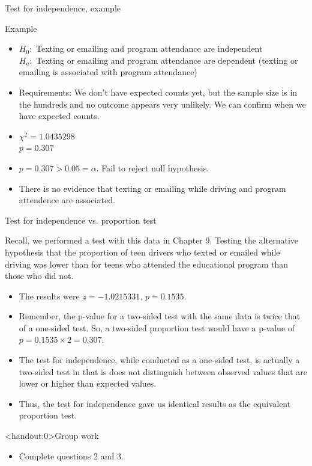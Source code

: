 \documentclass[xcolor=table]{beamer}
\begin{document}
\begin{frame}{Test for independence, example}
\begin{exampleblock}{Example}
\large
\begin{itemize}
\pause\item $H_0:$ Texting or emailing and program attendance are independent\\
$H_a:$ Texting or emailing and program attendance are dependent (texting or emailing is associated with program attendance)
\pause\item Requirements: We don't have expected counts yet, but the sample size is in the hundreds and no outcome appears very unlikely. We can confirm when we have expected counts.
\pause\item $\chi^2 = 1.0435298$\\
$p = 0.307 $
\pause\item $p = 0.307 > 0.05 = \alpha$. Fail to reject null hypothesis.
\pause\item There is no evidence that texting or emailing while driving and program attendence are associated.
\end{itemize}
\end{exampleblock}
\end{frame}

\begin{frame}{Test for independence vs. proportion test}
\begin{block}{}
\large
Recall, we performed a test with this data in Chapter 9. Testing the alternative hypothesis that the proportion of teen drivers who texted or emailed while driving was lower than for teens who attended the educational program than those who did not. \\
\begin{itemize}
\pause\item The results were $z = -1.0215331, \, p = 0.1535$.\\
\pause\item Remember, the p-value for a two-sided test with the same data is twice that of a one-sided test. So, a two-sided proportion test would have a p-value of $p = 0.1535 \times 2 = 0.307$.\\
\pause\item The test for independence, while conducted as a one-sided test, is actually a two-sided test in that is does not distinguish between observed values that are lower or higher than expected values.\\
\pause\item Thus, the test for independence gave us identical results as the equivalent proportion test.
\end{itemize}
\end{block}
\end{frame}


\begin{frame}<handout:0>{Group work}
\begin{block}{}
\large
\begin{itemize}
\item Complete questions 2 and 3.
\end{itemize}
\end{block}
\end{frame}
\end{document}
